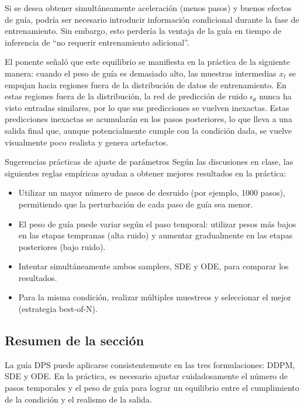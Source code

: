 Si se desea obtener simultáneamente aceleración (menos pasos) y buenos efectos de guía, podría ser necesario introducir información condicional durante la fase de entrenamiento. Sin embargo, esto perdería la ventaja de la guía en tiempo de inferencia de ``no requerir entrenamiento adicional''.

El ponente señaló que este equilibrio se manifiesta en la práctica de la siguiente manera: cuando el peso de guía es demasiado alto, las muestras intermedias $x_t$ se empujan hacia regiones fuera de la distribución de datos de entrenamiento. En estas regiones fuera de la distribución, la red de predicción de ruido $\epsilon_\theta$ nunca ha visto entradas similares, por lo que sus predicciones se vuelven inexactas. Estas predicciones inexactas se acumularán en los pasos posteriores, lo que lleva a una salida final que, aunque potencialmente cumple con la condición dada, se vuelve visualmente poco realista y genera artefactos.

\begin{knowledgebox}{Sugerencias prácticas de ajuste de parámetros}
Según las discusiones en clase, las siguientes reglas empíricas ayudan a obtener mejores resultados en la práctica:
\begin{itemize}
    \item Utilizar un mayor número de pasos de desruido (por ejemplo, 1000 pasos), permitiendo que la perturbación de cada paso de guía sea menor.
    \item El peso de guía puede variar según el paso temporal: utilizar pesos más bajos en las etapas tempranas (alta ruido) y aumentar gradualmente en las etapas posteriores (bajo ruido).
    \item Intentar simultáneamente ambos samplers, SDE y ODE, para comparar los resultados.
    \item Para la misma condición, realizar múltiples muestreos y seleccionar el mejor (estrategia best-of-N).
\end{itemize}
\end{knowledgebox}

\subsection{Resumen de la sección}

La guía DPS puede aplicarse consistentemente en las tres formulaciones: DDPM, SDE y ODE. En la práctica, es necesario ajustar cuidadosamente el número de pasos temporales y el peso de guía para lograr un equilibrio entre el cumplimiento de la condición y el realismo de la salida.


